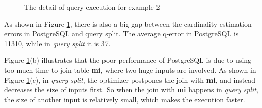 \begin{figure}[htb]
{\begin{minipage}[t]{0.47\linewidth}
            \end{minipage}
        }
        \centering
        \caption{The detail of query execution for example 2}
        \label{F16}
        \Description{}
    \end{figure}\par
    As shown in Figure \ref{F16}, there is also a big gap between the cardinality estimation errors in PostgreSQL and query split. The average q-error in PostgreSQL is 11310, while in \textit{query split} it is 37.\par
    Figure \ref{F16}(b) illustrates that the poor performance of PostgreSQL is due to using too much time to join table \textbf{mi}, where two huge inputs are involved. As shown in Figure \ref{F16}(c), in \textit{query split}, the optimizer postpones the join with \textbf{mi}, and instead decreases the size of inputs first. So when the join with \textbf{mi} happens in \textit{query split}, the size of another input is relatively small, which makes the execution faster.

